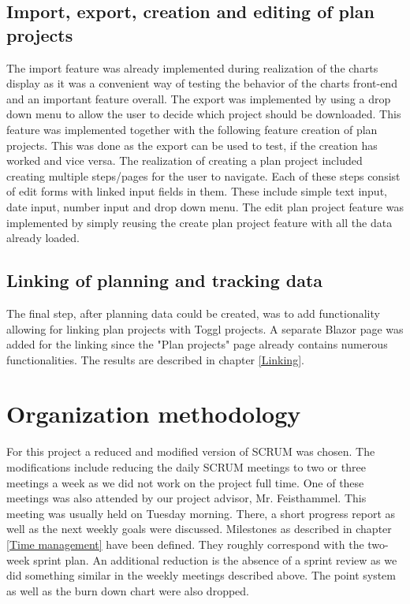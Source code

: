 \subsection{Import, export, creation and editing of plan projects}
The import feature was already implemented during realization of the charts display as it was a convenient way of testing the behavior of the charts front-end and an important feature overall. The export was implemented by using a drop down menu to allow the user to decide which project should be downloaded. This feature was implemented together with the following feature creation of plan projects. This was done as the export can be used to test, if the creation has worked and vice versa. The realization of creating a plan project included creating multiple steps/pages for the user to navigate. Each of these steps consist of edit forms with linked input fields in them. These include simple text input, date input, number input and drop down menu. The edit plan project feature was implemented by simply reusing the create plan project feature with all the data already loaded.

\subsection{Linking of planning and tracking data}
The final step, after planning data could be created, was to add functionality allowing for linking plan projects with Toggl projects. A separate Blazor page was added for the linking since the "Plan projects" page already contains
numerous functionalities. The results are described in chapter \ref{Linking}.

\section{Organization methodology}
For this project a reduced and modified version of SCRUM \cite{scrum_url} was chosen. The modifications include reducing the daily SCRUM meetings to two or three meetings a week as we did not work on the project full time. One of these meetings was also attended by our project advisor, Mr. Feisthammel. This meeting was usually held on Tuesday morning. There, a short progress report as well as the next weekly goals were discussed. Milestones as described in chapter \ref{Time management} have been defined. They roughly correspond with the two-week sprint plan. An additional reduction is the absence of a sprint review as we did something similar in the weekly meetings described above. The point system as well as the burn down chart were also dropped.

